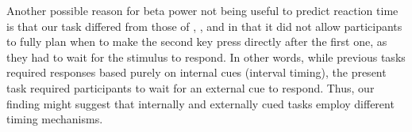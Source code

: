 \documentclass[man,floatsintext]{apa6} %
\begin{document}
Another possible reason for beta power not being useful to predict
reaction time is that our task differed from those of
, , and
 in that it did not allow participants
to fully plan when to make the second key press directly after the
first one, as they had to wait for the stimulus to respond. In other
words, while previous tasks required responses based purely on
internal cues (interval timing), the present task required
participants to wait for an external cue to respond. Thus, our finding
might suggest that internally and externally cued tasks employ
different timing mechanisms.











\end{document}
